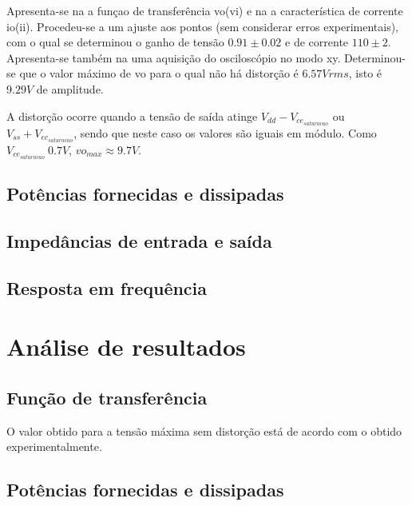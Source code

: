 \documentclass[%
  reprint,
  nofootinbib,
  amsmath,amssymb,
  aps,
  10pt,
  a4paper
]{revtex4-1}
\begin{document}

Apresenta-se na  a funçao de transferência vo(vi) e na  a característica de corrente io(ii). Procedeu-se a um ajuste aos pontos (sem considerar erros experimentais), com o qual se determinou o ganho de tensão $0.91\pm0.02$ e de corrente $110\pm2$. Apresenta-se também na  uma aquisição do osciloscópio no modo xy.
Determinou-se que o valor máximo de vo para o qual não há distorção é $6.57 V rms$, isto é $9.29 V$ de amplitude.

A distorção ocorre quando a tensão de saída atinge $V_{dd} - V_{ce_{saturacao}}$ ou $V_{ss} + V_{ec_{saturacao}}$, sendo que neste caso os valores são iguais em módulo. Como $V_{ce_{saturacao}}~0.7V$, $vo_{max}\approx9.7 V$.


\subsection{Potências fornecidas e dissipadas}



\subsection{Impedâncias de entrada e saída}
\subsection{Resposta em frequência}






\section{Análise de resultados}
\label{s:aresul}

\subsection{Função de transferência}

O valor obtido para a tensão máxima sem distorção está de acordo com o obtido experimentalmente.

\subsection{Potências fornecidas e dissipadas}
\end{document}
